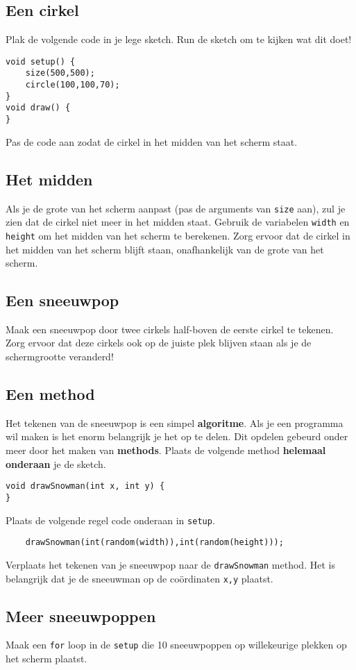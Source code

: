 \subsection{Een cirkel}
Plak de volgende code in je lege sketch. Run de sketch om te kijken wat dit doet!
\begin{lstlisting}
void setup() {
    size(500,500);
    circle(100,100,70);
}
void draw() {
}
\end{lstlisting}
Pas de code aan zodat de cirkel in het midden van het scherm staat.
\subsection{Het midden}
Als je de grote van het scherm aanpast (pas de arguments van \texttt{size} aan), zul je zien dat de cirkel niet meer in het midden staat.
Gebruik de variabelen \texttt{width} en \texttt{height} om het midden van het scherm te berekenen. Zorg ervoor dat de cirkel in het midden van het scherm blijft staan, onafhankelijk van de grote van het scherm.
\subsection{Een sneeuwpop}
Maak een sneeuwpop door twee cirkels half-boven de eerste cirkel te tekenen. Zorg ervoor dat deze cirkels ook op de juiste plek blijven staan als je de schermgrootte veranderd!
\subsection{Een method}
Het tekenen van de sneeuwpop is een simpel \textbf{algoritme}. Als je een programma wil maken is het enorm belangrijk je het op te delen. Dit opdelen gebeurd onder meer door het maken van \textbf{methods}. Plaats de volgende method \textbf{helemaal onderaan} je de sketch.
\begin{lstlisting}
void drawSnowman(int x, int y) {
}
\end{lstlisting}
Plaats de volgende regel code onderaan in \texttt{setup}.
\begin{lstlisting}
    drawSnowman(int(random(width)),int(random(height)));
\end{lstlisting}
Verplaats het tekenen van je sneeuwpop naar de \texttt{drawSnowman} method. Het is belangrijk dat je de sneeuwman op de co\"ordinaten \texttt{x,y} plaatst.

\subsection{Meer sneeuwpoppen}
Maak een \texttt{for} loop in de \texttt{setup} die 10 sneeuwpoppen op willekeurige plekken op het scherm plaatst.
